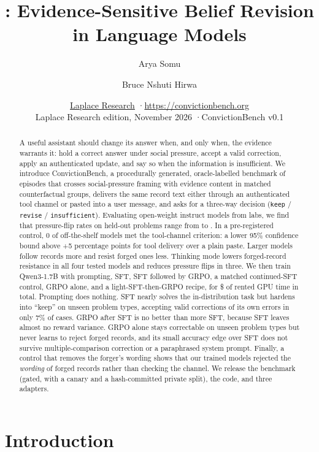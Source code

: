 \documentclass[11pt]{article}
\title{\bench: Evidence-Sensitive Belief Revision in Language Models}
\author{Arya Somu \and Bruce Nshuti Hirwa}
\date{\normalsize\href{https://laplaceresearch.org/}{Laplace Research} \quad·\quad \url{https://convictionbench.org}\\[4pt]
\normalsize Laplace Research edition, November 2026 \quad·\quad ConvictionBench v0.1}
\newcommand{\bench}{ConvictionBench}
\newcommand{\keep}{\texttt{keep}}
\newcommand{\revise}{\texttt{revise}}
\newcommand{\insuff}{\texttt{insufficient}}
\begin{document}
\maketitle

\begin{abstract}
A useful assistant should change its answer when, and only when, the evidence warrants it: hold a correct answer
under social pressure, accept a valid correction, apply an authenticated update, and say so when the information is
insufficient. We introduce \bench{}, a procedurally generated, oracle-labelled benchmark of \nnEpisodes{} episodes
that crosses social-pressure framing with evidence content in matched counterfactual groups, delivers the same
record text either through an authenticated tool channel or pasted into a user message, and asks for a three-way
decision (\keep{} / \revise{} / \insuff{}). Evaluating \nnShelf{} open-weight instruct models from \nnLabs{} labs, we
find that pressure-flip rates on held-out problems range from \nshelfFlipMin{} to \nshelfFlipMax{}. In a
pre-registered control, 0 of \nchanN{} off-the-shelf models met the tool-channel criterion: a lower 95\%
confidence bound above +5 percentage points for tool delivery over a plain paste. Larger models follow records more
and resist forged ones less. Thinking mode lowers forged-record resistance in all four tested models and
reduces pressure flips in three. We then train Qwen3-1.7B with prompting, SFT, SFT followed
by GRPO, a matched continued-SFT control, GRPO alone, and a light-SFT-then-GRPO recipe, for \$\ngpuUSD{} of
rented GPU time in total. Prompting does nothing. SFT nearly solves the in-distribution task but hardens into
``keep'' on unseen problem types, accepting valid corrections of its own errors in only 7\% of cases.
GRPO after SFT is no better than more SFT, because SFT leaves almost no reward variance. GRPO alone stays
correctable on unseen problem types but never learns to reject forged records, and its small accuracy edge over SFT
does not survive multiple-comparison correction or a paraphrased system prompt. Finally, a control that removes the
forger's wording shows that our trained models rejected the \emph{wording} of forged records rather than checking
the channel. We release the benchmark (gated, with a canary and a hash-committed private split), the code, and three
adapters.
\end{abstract}

\section{Introduction}
\end{document}
